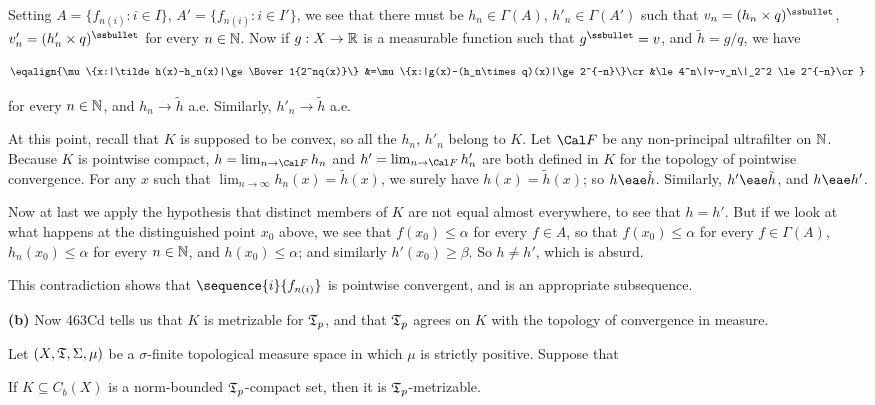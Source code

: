 {Setting $A=\{f_{n(i)}:i\in I\}$, $A'=\{f_{n(i)}:i\in I'\}$, we see that
there must be $h_n\in\Gamma(A)$, $h'_n\in\Gamma(A')$ such that
$v_n=(h_n\times q)^{\ssbullet}$, $v'_n=(h'_n\times
q)^{\ssbullet}$ for every $n\in\Bbb N$.   Now if $g:X\to\Bbb R$ is
a measurable function such that $g^{\ssbullet}=v$, and 
$\tilde h=g/q$, we have

$$\eqalign{\mu\{x:|\tilde h(x)-h_n(x)|\ge\Bover1{2^nq(x)}\}
&=\mu\{x:|g(x)-(h_n\times q)(x)|\ge 2^{-n}\}\cr
&\le 4^n\|v-v_n\|_2^2
\le 2^{-n}\cr}$$

\noindent for every $n\in\Bbb N$, and $h_n\to\tilde h$ a.e.   Similarly,
$h'_n\to\tilde h$ a.e.

At this point, recall that $K$ is supposed to be convex, so all the
$h_n$, $h'_n$ belong to $K$.   Let $\Cal F$ be any non-principal
ultrafilter on $\Bbb N$.   Because $K$ is pointwise compact,
$h=\lim_{n\to\Cal F}h_n$ and $h'=\lim_{n\to\Cal F}h'_n$ are both defined
in $K$ for the topology of pointwise convergence.   For any $x$ such
that
$\lim_{n\to\infty}h_n(x)=\tilde h(x)$, we surely have $h(x)=\tilde
h(x)$;  so $h\eae\tilde h$.   Similarly, $h'\eae\tilde h$, and
$h\eae h'$.

Now at last we apply the hypothesis that distinct members of $K$ are not
equal almost everywhere, to see that $h=h'$.   But if we look at what
happens at the distinguished point $x_0$ above, we see that
$f(x_0)\le\alpha$ for every $f\in A$, so that $f(x_0)\le\alpha$ for
every $f\in\Gamma(A)$, $h_n(x_0)\le\alpha$ for every $n\in\Bbb N$, and
$h(x_0)\le\alpha$;  and similarly $h'(x_0)\ge\beta$.   So $h\ne h'$,
which is absurd.\ \Bang

This contradiction shows that $\sequence{i}{f_{n(i)}}$ is pointwise
convergent, and is an appropriate subsequence.\ \Qed

\medskip

{\bf (b)} Now 463Cd tells us that $K$ is metrizable for $\frak T_p$, and
that $\frak T_p$ agrees on $K$ with the topology of convergence in
measure.
}%

 Let $(X,\frak T,\Sigma,\mu)$ be a
$\sigma$-finite topological measure space in which $\mu$ is strictly
positive.   Suppose that


\noindent If $K\subseteq C_b(X)$ is a norm-bounded $\frak T_p$-compact
set, then it is $\frak T_p$-metrizable.


